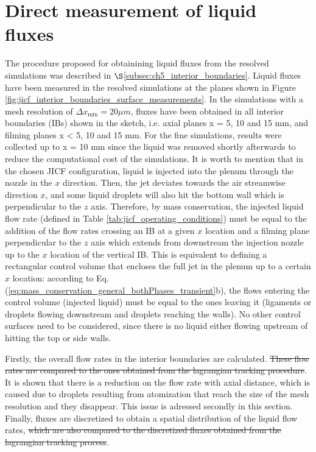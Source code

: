 \clearpage

\section{Direct measurement of liquid fluxes}

The procedure proposed for obtainining liquid fluxes from the resolved simulations was described in $\S$\ref{subsec:ch5_interior_boundaries}. Liquid fluxes have been measured in the resolved simulations at the planes shown in Figure \ref{fig:jicf_interior_boundaries_surface_measurements}. In the simulations with a mesh resolution of $\Delta x_\mathrm{min} = 20 \mu m$, fluxes have been obtained in all interior boundaries (IBs) shown in the sketch, i.e. axial planes x = 5, 10 and 15 mm, and filming planes x < 5, 10 and 15 mm. For the fine simulations, results were collected up to x = 10 mm since the liquid was removed shortly afterwards to reduce the computational cost of the simulations. It is worth to mention that in the chosen JICF configuration, liquid is injected into the plenum through the nozzle in the $x$ direction. Then, the jet deviates towards the air streamwise direction $x$, and some liquid droplets will also hit the bottom wall which is perpendicular to the $z$ axis. Therefore, by mass conservation, the injected liquid flow rate (defined in Table \ref{tab:jicf_operating_conditions}) must be equal to the addition of the flow rates crossing an IB at a given $x$ location and a filming plane perpendicular to the $z$ axis which extends from downstream the injection nozzle up to the $x$ location of the vertical IB. This is equivalent to defining a rectangular control volume that encloses the full jet in the plenum up to a certain $x$ location: according to Eq. (\ref{eq:mass_conservation_general_bothPhases_transient}b), the flows entering the control volume (injected liquid) must be equal to the ones leaving it (ligaments or droplets flowing downstream and droplets reaching the walls). No other control surfaces need to be considered, since there is no liquid either flowing upstream of hitting the top or side walls.

Firstly, the overall flow rates in the interior boundaries are calculated. \st{These flow rates are compared to the ones obtained from the lagrangian tracking procedure}. It is shown that there is a reduction on the flow rate with axial distance, which is caused due to droplets resulting from atomization that reach the size of the mesh resolution and they disappear. This issue is adressed secondly in this section. Finally, fluxes are discretized to obtain a spatial distribution of the liquid flow rates, \st{which are also compared to the discretized fluxes obtained from the lagrangian tracking process}.

